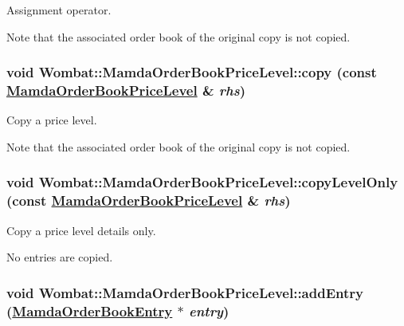 Assignment operator. 

Note that the associated order book of the original copy is not copied. \hypertarget{classWombat_1_1MamdaOrderBookPriceLevel_ec111c85e21764c14ff1b66adb994563}{
\subsubsection[copy]{\setlength{\rightskip}{0pt plus 5cm}void Wombat::Mamda\-Order\-Book\-Price\-Level::copy (const \hyperlink{classWombat_1_1MamdaOrderBookPriceLevel}{Mamda\-Order\-Book\-Price\-Level} \& {\em rhs})}}
\label{classWombat_1_1MamdaOrderBookPriceLevel_ec111c85e21764c14ff1b66adb994563}


Copy a price level. 

Note that the associated order book of the original copy is not copied. \hypertarget{classWombat_1_1MamdaOrderBookPriceLevel_5582554127b099dca98aa1698d8e4192}{
\subsubsection[copyLevelOnly]{\setlength{\rightskip}{0pt plus 5cm}void Wombat::Mamda\-Order\-Book\-Price\-Level::copy\-Level\-Only (const \hyperlink{classWombat_1_1MamdaOrderBookPriceLevel}{Mamda\-Order\-Book\-Price\-Level} \& {\em rhs})}}
\label{classWombat_1_1MamdaOrderBookPriceLevel_5582554127b099dca98aa1698d8e4192}


Copy a price level details only. 

No entries are copied. \hypertarget{classWombat_1_1MamdaOrderBookPriceLevel_7d8a3426981170899154fd5893767d23}{
\subsubsection[addEntry]{\setlength{\rightskip}{0pt plus 5cm}void Wombat::Mamda\-Order\-Book\-Price\-Level::add\-Entry (\hyperlink{classWombat_1_1MamdaOrderBookEntry}{Mamda\-Order\-Book\-Entry} $\ast$ {\em entry})}}
\label{classWombat_1_1MamdaOrderBookPriceLevel_7d8a3426981170899154fd5893767d23}


